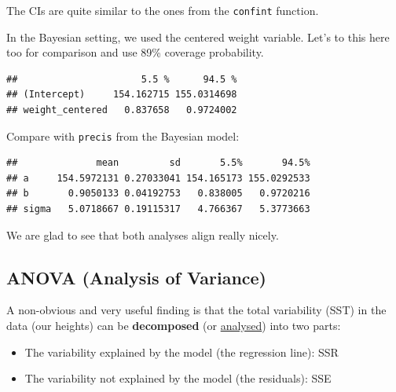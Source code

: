 \documentclass[
]{book}
\newenvironment{Shaded}{\begin{snugshade}}{\end{snugshade}}
\newcommand{\AttributeTok}[1]{\textcolor[rgb]{0.13,0.29,0.53}{#1}}
\newcommand{\CommentTok}[1]{\textcolor[rgb]{0.56,0.35,0.01}{\textit{#1}}}
\newcommand{\FloatTok}[1]{\textcolor[rgb]{0.00,0.00,0.81}{#1}}
\newcommand{\FunctionTok}[1]{\textcolor[rgb]{0.13,0.29,0.53}{\textbf{#1}}}
\newcommand{\NormalTok}[1]{#1}
\newcommand{\OtherTok}[1]{\textcolor[rgb]{0.56,0.35,0.01}{#1}}
\newcommand{\SpecialCharTok}[1]{\textcolor[rgb]{0.81,0.36,0.00}{\textbf{#1}}}
\providecommand{\tightlist}{%
  \setlength{\itemsep}{0pt}\setlength{\parskip}{0pt}}
\begin{document}
The CIs are quite similar to the ones from the \texttt{confint} function.

In the Bayesian setting, we used the centered weight variable. Let's to this here too for
comparison and use 89\% coverage probability.

\begin{Shaded}
\end{Shaded}

\begin{verbatim}
##                      5.5 %      94.5 %
## (Intercept)     154.162715 155.0314698
## weight_centered   0.837658   0.9724002
\end{verbatim}

Compare with \texttt{precis} from the Bayesian model:

\begin{verbatim}
##              mean         sd       5.5%       94.5%
## a     154.5972131 0.27033041 154.165173 155.0292533
## b       0.9050133 0.04192753   0.838005   0.9720216
## sigma   5.0718667 0.19115317   4.766367   5.3773663
\end{verbatim}

We are glad to see that both analyses align really nicely.

\subsection{ANOVA (Analysis of Variance)}\label{analysis_of_variance}

A non-obvious and very useful finding is that the total variability (SST)
in the data (our heights) can be
\textbf{decomposed} (or \href{https://en.wiktionary.org/wiki/analysis}{analysed})
into two parts:

\begin{itemize}
\tightlist
\item
  The variability explained by the model (the regression line): SSR
\item
  The variability not explained by the model (the residuals): SSE
\end{itemize}
\end{document}
